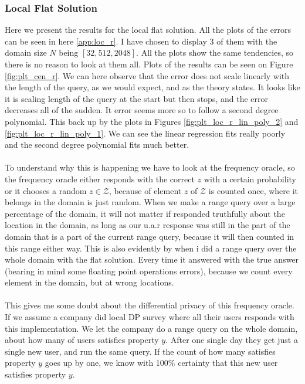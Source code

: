 \documentclass[11pt]{article}
\theoremstyle{definition}
\begin{document}
\subsubsection{Local Flat Solution}
Here we present the results for the local flat solution. All the plots of the errors can be seen in here \ref{app:loc_r}. I have chosen to display 3 of them with the domain size $N$ being $[32,512,2048]$. All the plots show the same tendencies, so there is no reason to look at them all. Plots of the results can be seen on Figure \ref{fig:plt_cen_r}. We can here observe that the error does not scale linearly with the length of the query, as we would expect, and as the theory states. It looks like it is scaling length of the query at the start but then stops, and the error decreases all of the sudden. It error seems more so to follow a second degree polynomial. This back up by the plots in Figures \ref{fig:plt_loc_r_lin_poly_2} and \ref{fig:plt_loc_r_lin_poly_1}. We can see the linear regression fits really poorly and the second degree polynomial fits much better. \\ \\ 
To understand why this is happening we have to look at the frequency oracle, so the frequency oracle either responds with the correct $z$ with a certain probability or it chooses a random $z\in\mathcal{Z}$, because of element $z$ of $\mathcal{Z}$ is counted once, where it belongs in the domain is just random. When we make a range query over a large percentage of the domain, it will not matter if responded truthfully about the location in the domain, as long as our u.a.r response was still in the part of the domain that is a part of the current range query, because it will then counted in this range either way. This is also evidently by when i did a range query over the whole domain with the flat solution. Every time it answered with the true answer (bearing in mind some floating point operations errors), because we count every element in the domain, but at wrong locations.\\ \\
This gives me some doubt about the differential privacy of this frequency oracle. If we assume a company did local DP survey where all their users responds with this implementation. We let the company do a range query on the whole domain, about how many of users satisfies property $y$. After one single day they get just a single new user, and run the same query. If the count of how many satisfies property $y$ goes up by one, we know with 100\% certainty that this new user satisfies property $y$.
\end{document}
